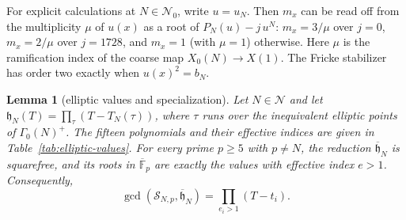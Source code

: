 \documentclass[11pt,a4paper]{article}
\numberwithin{equation}{section}
\newtheorem{lemma}[theorem]{Lemma}
\theoremstyle{definition}
\theoremstyle{remark}
\newcommand{\Fb}{\overline{\mathbb F}_p}
\begin{document}
For explicit calculations at $N\in\mathcal N_0$, write $u=u_N$.
Then $m_x$ can be read off from the multiplicity $\mu$ of $u(x)$ as a root of
$P_N(u)-j\,u^N$: $m_x=3/\mu$ over $j=0$, $m_x=2/\mu$ over $j=1728$, and $m_x=1$ (with $\mu=1$) otherwise.
Here $\mu$ is the ramification index of the coarse map $X_0(N)\to X(1)$.
The Fricke stabilizer has order two exactly when $u(x)^2=b_N$.

\begin{lemma}[elliptic values and specialization]\label{lem:elliptic-specialization}
Let $N\in\mathcal N$ and let
$\mathfrak h_N(T)=\prod_{\tau}(T-T_N(\tau))$, where $\tau$ runs over the
inequivalent elliptic points of $\Gamma_0(N)^+$.
The fifteen polynomials and their effective indices are given in
Table~\ref{tab:elliptic-values}.
For every prime $p\ge5$ with $p\ne N$, the reduction
$\overline{\mathfrak h}_N$ is squarefree, and its roots in $\Fb$ are exactly the
values with effective index $e>1$. Consequently,
\[
\gcd(\mathcal S_{N,p},\overline{\mathfrak h}_N)=\prod_{e_i>1}(T-t_i).
\]
\end{lemma}
\end{document}
